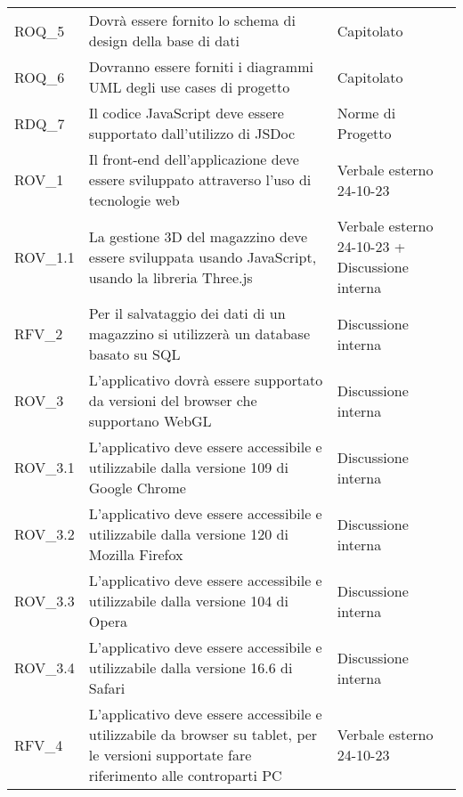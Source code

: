 \begin{xltabular}{\textwidth}{ p{0.2\textwidth} | X | p{0.2\textwidth} }
    ROQ\_5& Dovrà essere fornito lo schema di design della base di dati & Capitolato  \\
    ROQ\_6& Dovranno essere forniti i diagrammi UML degli use cases di progetto & Capitolato  \\
    RDQ\_7& Il codice JavaScript deve essere supportato dall'utilizzo di JSDoc & Norme di Progetto \\
    ROV\_1& Il front-end dell'applicazione deve essere sviluppato attraverso l'uso di tecnologie web & Verbale esterno 24-10-23 \\
    ROV\_1.1& La gestione 3D del magazzino deve essere sviluppata usando JavaScript, usando la libreria Three.js & Verbale esterno 24-10-23 + Discussione interna \\
    RFV\_2& Per il salvataggio dei dati di un magazzino si utilizzerà un database basato su SQL & Discussione interna\\
    ROV\_3& L'applicativo dovrà essere supportato da versioni del browser che supportano WebGL & Discussione interna\\
    ROV\_3.1& L'applicativo deve essere accessibile e utilizzabile dalla versione 109 di Google Chrome & Discussione interna\\
    ROV\_3.2& L'applicativo deve essere accessibile e utilizzabile dalla versione 120 di Mozilla Firefox & Discussione interna\\
    ROV\_3.3& L'applicativo deve essere accessibile e utilizzabile dalla versione 104 di Opera & Discussione interna\\
    ROV\_3.4& L'applicativo deve essere accessibile e utilizzabile dalla versione 16.6 di Safari & Discussione interna\\
    RFV\_4& L'applicativo deve essere accessibile e utilizzabile da browser su tablet, per le versioni supportate fare riferimento alle controparti PC & Verbale esterno 24-10-23\\
    \hline

    \hline
\end{xltabular}


\renewcommand{\arraystretch}{1.25}
